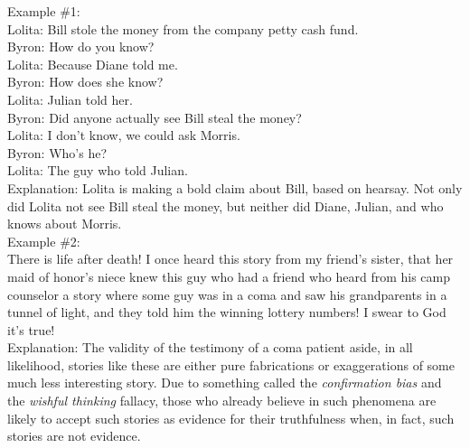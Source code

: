 \documentclass[a4paper,12pt,single,pdftex]{scrartcl}
\begin{document}
    
      Example \#1:
    \\

    
      Lolita: Bill stole the money from the company petty cash fund.
    \\

    
      Byron: How do you know?
    \\

    
      Lolita: Because Diane told me.
    \\

    
      Byron: How does she know?
    \\

    
      Lolita: Julian told her.
    \\

    
      Byron: Did anyone actually see Bill steal the money?
    \\

    
      Lolita:  I don’t know, we could ask Morris.
    \\

    
      Byron: Who’s he?
    \\

    
      Lolita: The guy who told Julian.
    \\

    
      Explanation: Lolita is making a bold claim about Bill, based on hearsay.  Not only did Lolita not see Bill steal the money, but neither did Diane, Julian, and who knows about Morris.
    \\

    
      Example \#2:
    \\

    
      There is life after death!  I once heard this story from my friend’s sister, that her maid of honor’s niece knew this guy who had a friend who heard from his camp counselor a story where some guy was in a coma and saw his grandparents in a tunnel of light, and they told him the winning lottery numbers!  I swear to God it’s true!
    \\

    
      Explanation: The validity of the testimony of a coma patient aside, in all likelihood, stories like these are either pure fabrications or exaggerations of some much less interesting story.  Due to something called the {\it confirmation bias} and the {\it wishful thinking}  fallacy, those who already believe in such phenomena are likely to accept such stories as evidence for their truthfulness when, in fact, such stories are not evidence.
    \\
\end{document}

